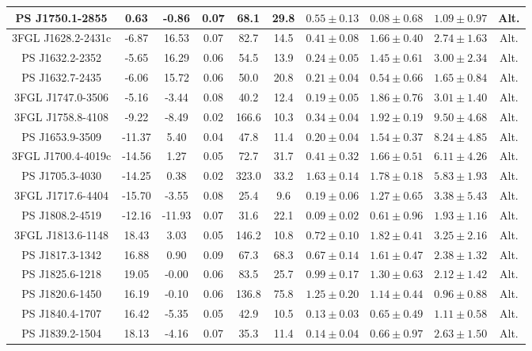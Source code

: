 \begin{table*}
\begin{tabular}{|c|c|c|c|c|c|c|c|c|c|}
\hline 
 PS J1750.1-2855 & 0.63 & -0.86 & 0.07 & 68.1 & 29.8 & $0.55\pm0.13$ & $0.08\pm 0.68$ & $1.09\pm0.97$ & Alt. \\
\hline 
 3FGL J1628.2-2431c & -6.87 & 16.53 & 0.07 & 82.7 & 14.5 & $0.41\pm0.08$ & $1.66\pm0.40$ & $2.74\pm1.63$ & Alt. \\
\hline 
 PS J1632.2-2352 & -5.65 & 16.29 & 0.06 & 54.5 & 13.9 & $0.24\pm0.05$ & $1.45\pm0.61$ & $3.00\pm2.34$ & Alt. \\
\hline 
 PS J1632.7-2435 & -6.06 & 15.72 & 0.06 & 50.0 & 20.8 & $0.21\pm0.04$ & $0.54\pm0.66$ & $1.65\pm0.84$ & Alt. \\
\hline 
 3FGL J1747.0-3506 & -5.16 & -3.44 & 0.08 & 40.2 & 12.4 & $0.19\pm0.05$ & $1.86\pm0.76$ & $3.01\pm1.40$ & Alt. \\
\hline 
 3FGL J1758.8-4108 & -9.22 & -8.49 & 0.02 & 166.6 & 10.3 & $0.34\pm0.04$ & $1.92\pm0.19$ & $9.50\pm4.68$ & Alt. \\
\hline 
 PS J1653.9-3509 & -11.37 & 5.40 & 0.04 & 47.8 & 11.4 & $0.20\pm0.04$ & $1.54\pm0.37$ & $8.24\pm4.85$ & Alt. \\
\hline 
 3FGL J1700.4-4019c & -14.56 & 1.27 & 0.05 & 72.7 & 31.7 & $0.41\pm0.32$ & $1.66\pm 0.51$ & $6.11\pm4.26$ & Alt. \\
\hline 
 PS J1705.3-4030 & -14.25 & 0.38 & 0.02 & 323.0 & 33.2 & $1.63\pm0.14$ & $1.78\pm0.18$ & $5.83\pm1.93$ & Alt. \\
\hline 
 3FGL J1717.6-4404 & -15.70 & -3.55 & 0.08 & 25.4 & 9.6 & $0.19\pm0.06$ & $1.27\pm0.65$ & $3.38\pm5.43$ & Alt. \\
\hline 
 PS J1808.2-4519 & -12.16 & -11.93 & 0.07 & 31.6 & 22.1 & $0.09\pm0.02$ & $0.61\pm0.96$ & $1.93\pm1.16$ & Alt. \\
\hline 
 3FGL J1813.6-1148 & 18.43 & 3.03 & 0.05 & 146.2 & 10.8 & $0.72\pm0.10$ & $1.82\pm0.41$ & $3.25\pm2.16$ & Alt. \\
\hline 
 PS J1817.3-1342 & 16.88 & 0.90 & 0.09 & 67.3 & 68.3 & $0.67\pm0.14$ & $1.61\pm0.47$ & $2.38\pm1.32$ & Alt. \\
\hline 
 PS J1825.6-1218 & 19.05 & -0.00 & 0.06 & 83.5 & 25.7 & $0.99\pm0.17$ & $1.30\pm0.63$ & $2.12\pm1.42$ & Alt. \\
\hline 
 PS J1820.6-1450 & 16.19 & -0.10 & 0.06 & 136.8 & 75.8 & $1.25\pm0.20$ & $1.14\pm 0.44$ & $0.96\pm0.88$ & Alt. \\
\hline 
 PS J1840.4-1707 & 16.42 & -5.35 & 0.05 & 42.9 & 10.5 & $0.13\pm0.03$ & $0.65\pm0.49$ & $1.11\pm0.58$ & Alt. \\
\hline 
 PS J1839.2-1504 & 18.13 & -4.16 & 0.07 & 35.3 & 11.4 & $0.14\pm0.04$ & $0.66\pm0.97$ & $2.63\pm1.50$ & Alt. \\

\end{tabular}
\end{table*}
